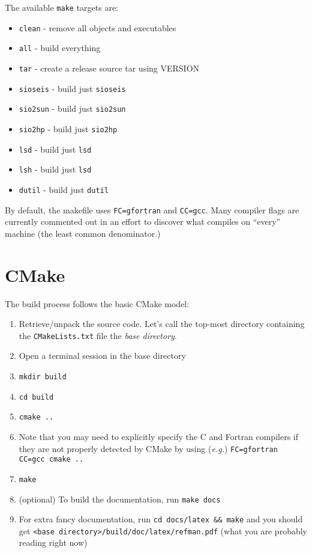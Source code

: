 The available \texttt{make} targets are:
\begin{itemize}
\item \texttt{clean}   - remove all objects and executables
\item \texttt{all}     - build everything
\item \texttt{tar}     - create a release source tar using VERSION
\item \texttt{sioseis} - build just \texttt{sioseis}
\item \texttt{sio2sun} - build just \texttt{sio2sun}
\item \texttt{sio2hp}  - build just \texttt{sio2hp}
\item \texttt{lsd}     - build just \texttt{lsd}
\item \texttt{lsh}     - build just \texttt{lsd}
\item \texttt{dutil}   - build just \texttt{dutil}
\end{itemize}

By default, the makefile uses \texttt{FC=gfortran} and \texttt{CC=gcc}.
Many compiler flags are currently commented out in an effort to discover what
compiles on ``every'' machine (the least common denominator.)

\section{CMake}

The build process follows the basic CMake model:
\begin{enumerate}
\item Retrieve/unpack the source code. Let's call the top-most directory containing the \texttt{CMakeLists.txt} file the \textit{base directory}.
\item Open a terminal session in the base directory
\item \texttt{mkdir build}
\item \texttt{cd build}
\item \texttt{cmake ..}
\item Note that you may need to explicitly specify the C and Fortran compilers
      if they are not properly detected by CMake by using (\textit{e.g.})
      \texttt{FC=gfortran CC=gcc cmake ..}
\item \texttt{make}
\item (optional) To build the documentation, run \texttt{make docs}
\item For extra fancy documentation, run \texttt{cd docs/latex \&\& make} and
      you should get \texttt{<base directory>/build/doc/latex/refman.pdf}
      (what you are probably reading right now)
\end{enumerate}

